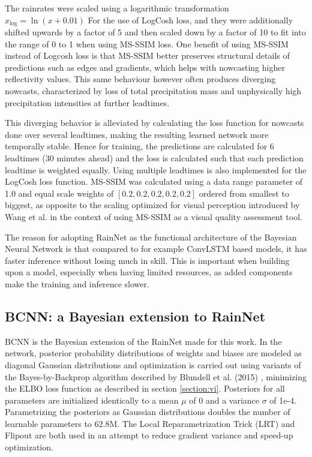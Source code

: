 The rainrates were scaled using a logarithmic transformation $x_{\log} = \ln(x + 0.01)$ For the use of LogCosh loss, and they were additionally shifted upwards by a factor of 5 and then scaled down by a factor of 10 to fit into the range of 0 to 1 when using MS-SSIM loss. One benefit of using MS-SSIM instead of Logcosh loss is that MS-SSIM better preserves structural details of predictions such as edges and gradients, which helps with nowcasting higher reflectivity values. This same behaviour however often produces diverging nowcasts, characterized by loss of total precipitation mass and unphysically high precipitation intensities at further leadtimes. 

This diverging behavior is alleviated by calculating the loss function for nowcasts done over several leadtimes, making the resulting learned network more temporally stable. Hence for training, the predictions are calculated for 6 leadtimes (30 minutes ahead) and the loss is calculated such that each prediction leadtime is weighted equally. Using multiple leadtimes is also implemented for the LogCosh loss function. MS-SSIM was calculated using a data range parameter of 1.0 and equal scale weights of $[0.2, 0.2, 0.2, 0.2, 0.2]$ ordered from smallest to biggest, as opposite to the scaling optimized for visual perception introduced by Wang et al. \cite{wang_multiscale_2003} in the context of using MS-SSIM as a visual quality assessment tool. 

The reason for adopting RainNet as the functional architecture of the Bayesian Neural Network is that compared to for example ConvLSTM based models, it has faster inference without losing much in skill. This is important when building upon a model, especially when having limited resources, as added components make the training and inference slower. 


\subsection{BCNN: a Bayesian extension to RainNet}


BCNN is the Bayesian extension of the RainNet made for this work. In the network, posterior probability distributions of weights and biases are modeled as diagonal Gaussian distributions and optimization is carried out using variants of the Bayes-by-Backprop algorithm described by Blundell et al. (2015) \cite{blundell_weight_2015}, minimizing the ELBO loss function as described in section \ref{section:vi}. Posteriors for all parameters are initialized identically to a mean $\mu$ of 0 and a variance $\sigma$ of 1e-4. Parametrizing the posteriors as Gaussian distributions doubles the number of learnable parameters to 62.8M. The Local Reparametrization Trick (LRT) \cite{kingma_variational_2015} and Flipout \cite{wen_flipout_2018} are both used in an attempt to reduce gradient variance and speed-up optimization. 

